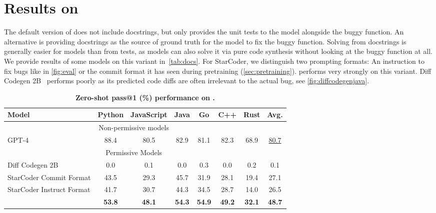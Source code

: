 \FloatBarrier


\section{Results on \evalfd{}}
\label{sec:docstrings}

The default version of \evalf{} does not include docstrings, but only provides the unit tests to the model alongside the buggy function. An alternative is providing docstrings as the source of ground truth for the model to fix the buggy function. Solving from docstrings is generally easier for models than from tests, as models can also solve it via pure code synthesis without looking at the buggy function at all. We provide results of some models on this variant in~\autoref{tab:docs}. For StarCoder, we distinguish two prompting formats: An instruction to fix bugs like in \autoref{fig:eval} or the commit format it has seen during pretraining (\autoref{sec:pretraining}). \model{} performs very strongly on this variant. Diff Codegen 2B~\citep{bradley2023diffmodels} performs poorly as its predicted code diffs are often irrelevant to the actual bug, see \autoref{fig:diffcodegenjava}.

\begin{table*}[htbp]
    \centering
\begin{tabular}{l|cccccc|c}
    \toprule
    Model & Python & JavaScript & Java & Go & C++ & Rust & Avg.\\
    \midrule
    \multicolumn{7}{c}{Non-permissive models} \\
    \midrule
GPT-4 & 88.4 & 80.5 & 82.9 & 81.1 & 82.3 & 68.9 & \underline{80.7}\\ 
\midrule
    \multicolumn{7}{c}{Permissive Models} \\
    \midrule
    Diff Codegen 2B & 0.0 & 0.1 & 0.0 & 0.3 & 0.0 & 0.2 & 0.1 \\
    StarCoder Commit Format & 43.5 & 29.3 & 45.7 & 31.9 & 28.1 & 19.4 & 27.1 \\ 
    StarCoder Instruct Format & 41.7 & 30.7 & 44.3 & 34.5 & 28.7 & 14.0 & 26.5 \\  
    \model{} & \textbf{53.8} & \textbf{48.1} & \textbf{54.3} & \textbf{54.9} & \textbf{49.2} & \textbf{32.1} & \textbf{48.7} \\
\bottomrule
    \end{tabular}
\caption{
        \textbf{Zero-shot pass@1 (\%) performance on \evalfd{}.}
    }
    \label{tab:docs}
\end{table*}


